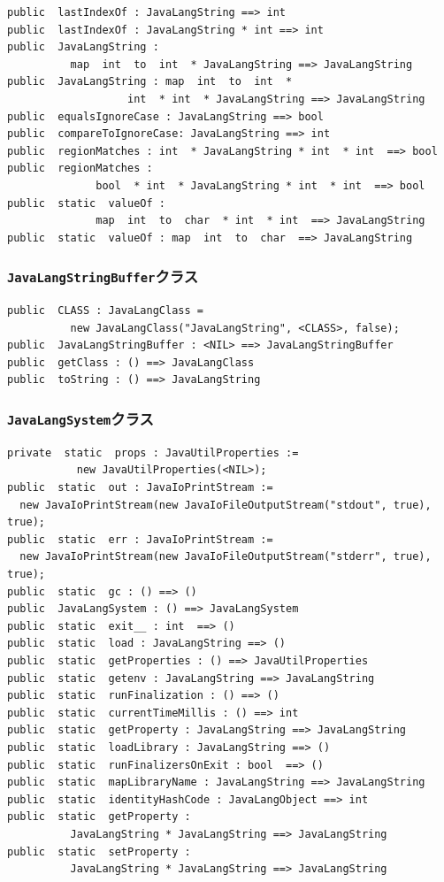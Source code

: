 \documentclass[\pformat,12pt]{jarticle}
\begin{document}
\begin{small}
\begin{verbatim}
public  lastIndexOf : JavaLangString ==> int
public  lastIndexOf : JavaLangString * int ==> int
public  JavaLangString : 
          map  int  to  int  * JavaLangString ==> JavaLangString
public  JavaLangString : map  int  to  int  * 
                   int  * int  * JavaLangString ==> JavaLangString
public  equalsIgnoreCase : JavaLangString ==> bool
public  compareToIgnoreCase: JavaLangString ==> int
public  regionMatches : int  * JavaLangString * int  * int  ==> bool
public  regionMatches : 
              bool  * int  * JavaLangString * int  * int  ==> bool
public  static  valueOf : 
              map  int  to  char  * int  * int  ==> JavaLangString
public  static  valueOf : map  int  to  char  ==> JavaLangString
\end{verbatim}
\end{small}

\subsubsection{\texttt{JavaLangStringBuffer}クラス}
\begin{small}
\begin{verbatim}
public  CLASS : JavaLangClass =
          new JavaLangClass("JavaLangString", <CLASS>, false);
public  JavaLangStringBuffer : <NIL> ==> JavaLangStringBuffer
public  getClass : () ==> JavaLangClass
public  toString : () ==> JavaLangString
\end{verbatim}
\end{small}

\subsubsection{\texttt{JavaLangSystem}クラス}
\begin{small}
\begin{verbatim}
private  static  props : JavaUtilProperties := 
           new JavaUtilProperties(<NIL>);
public  static  out : JavaIoPrintStream := 
  new JavaIoPrintStream(new JavaIoFileOutputStream("stdout", true), true);
public  static  err : JavaIoPrintStream := 
  new JavaIoPrintStream(new JavaIoFileOutputStream("stderr", true), true);
public  static  gc : () ==> ()
public  JavaLangSystem : () ==> JavaLangSystem
public  static  exit__ : int  ==> ()
public  static  load : JavaLangString ==> ()
public  static  getProperties : () ==> JavaUtilProperties
public  static  getenv : JavaLangString ==> JavaLangString
public  static  runFinalization : () ==> ()
public  static  currentTimeMillis : () ==> int
public  static  getProperty : JavaLangString ==> JavaLangString
public  static  loadLibrary : JavaLangString ==> ()
public  static  runFinalizersOnExit : bool  ==> ()
public  static  mapLibraryName : JavaLangString ==> JavaLangString
public  static  identityHashCode : JavaLangObject ==> int
public  static  getProperty : 
          JavaLangString * JavaLangString ==> JavaLangString
public  static  setProperty : 
          JavaLangString * JavaLangString ==> JavaLangString
\end{verbatim}
\end{small}
\end{document}
